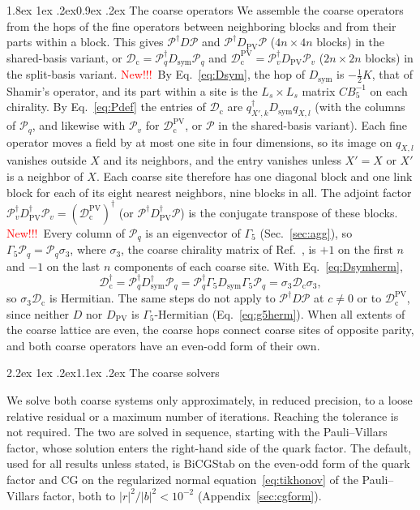 \documentclass[11pt,a4paper]{article}
\makeatletter
\newif\ifshownew \shownewtrue
\DeclareRobustCommand\New{\ifshownew\textcolor{red}{New!!!}\ \else\ignorespaces\fi}
\renewcommand\subsection{\@startsection{subsection}{2}{\z@}%
  {2.2ex \@plus 1ex \@minus .2ex}{1.1ex \@plus .2ex}%
  {\centering\normalfont\small\bfseries}}
\renewcommand\subsubsection{\@startsection{subsubsection}{3}{\z@}%
  {1.8ex \@plus 1ex \@minus .2ex}{0.9ex \@plus .2ex}%
  {\centering\normalfont\small\bfseries\itshape}}
\numberwithin{equation}{section}
\newcommand{\dg}{^{\dagger}}
\newcommand{\Dpv}{D_{\mathrm{PV}}}
\newcommand{\Gfive}{\Gamma_5}
\newcommand{\Pro}{\mathcal P}
\newcommand{\Pq}{\Pro_q}
\newcommand{\Pv}{\Pro_v}
\newcommand{\Dc}{\mathcal D_{\mathrm c}}
\newcommand{\Dsym}{D_{\mathrm{sym}}}
\newcommand{\Dcpv}{\mathcal D_{\mathrm c}^{\mathrm{PV}}}
\makeatother
\begin{document}
\subsubsection{The coarse operators}
\label{sec:coarseops}
We assemble the coarse operators from the hops of the fine operators between neighboring blocks and
from their parts within a block. This gives $\Pro\dg D\Pro$ and $\Pro\dg\Dpv\Pro$ ($4n\times4n$
blocks) in the shared-basis variant, or $\Dc=\Pq\dg\Dsym\Pq$ and $\Dcpv=\Pv\dg\Dpv\Pv$
($2n\times2n$ blocks) in the split-basis variant. \New By Eq.~\eqref{eq:Dsym}, the
hop of $\Dsym$ is $-\frac12K$, that of Shamir's operator, and its part within a site is the
$L_s\times L_s$ matrix $CB_5^{-1}$ on each chirality. By
Eq.~\eqref{eq:Pdef} the entries of $\Dc$ are $q_{X',k}\dg\Dsym q_{X,l}$ (with the columns of $\Pq$,
and likewise with $\Pv$ for $\Dcpv$, or $\Pro$ in the shared-basis variant). Each fine operator moves a field by at most
one site in four dimensions, so its image on $q_{X,l}$ vanishes outside $X$ and its neighbors, and the entry
vanishes unless $X'=X$ or $X'$ is a neighbor of $X$. Each coarse site therefore has one diagonal
block and one link block for each of its eight nearest neighbors, nine blocks in all. The adjoint
factor $\Pv\dg\Dpv\dg\Pv=(\Dcpv)\dg$ (or $\Pro\dg\Dpv\dg\Pro$) is the conjugate transpose of these
blocks. \New Every column of
$\Pq$ is an eigenvector of $\Gfive$ (Sec.~\ref{sec:agg}), so $\Gfive\Pq=\Pq\sigma_3$, where
$\sigma_3$, the coarse chirality matrix of Ref.~\cite{Babich}, is $+1$ on the first $n$ and $-1$ on
the last $n$ components of each coarse site. With Eq.~\eqref{eq:Dsymherm},
\begin{equation}
\Dc\dg=\Pq\dg\Dsym\dg\Pq=\Pq\dg\Gfive\Dsym\Gfive\Pq=\sigma_3\Dc\sigma_3 ,
\end{equation}
so $\sigma_3\Dc$ is Hermitian. The same steps do not apply to $\Pro\dg D\Pro$ at $c\neq0$ or to
$\Dcpv$, since neither $D$ nor $\Dpv$ is $\Gfive$-Hermitian (Eq.~\eqref{eq:g5herm}). When all
extents of the coarse lattice are even, the coarse hops connect coarse sites of opposite parity,
and both coarse operators have an even-odd form of their own.

\subsection{The coarse solvers}
\label{sec:coarse}

We solve both coarse systems only approximately, in reduced precision, to a loose relative
residual or a maximum number of iterations. Reaching the tolerance is not required. The two are
solved in sequence, starting with the Pauli--Villars factor, whose solution enters the right-hand side of
the quark factor. The default, used for all results unless stated, is BiCGStab on the even-odd
form of the quark factor and CG on the regularized normal equation~\eqref{eq:tikhonov} of the
Pauli--Villars factor, both to $|r|^2/|b|^2<10^{-2}$ (Appendix~\ref{sec:cgform}).
\end{document}
